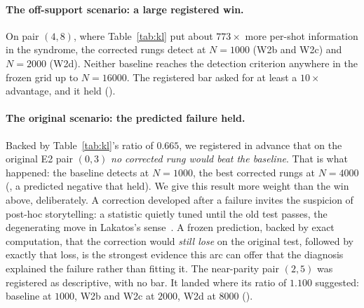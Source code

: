 \paragraph{The off-support scenario: a large registered win.} On pair $(4,8)$, where Table~\ref{tab:kl} put about $773\times$ more per-shot information in the syndrome, the corrected rungs detect at $N = 1000$ (W2b and W2c) and $N = 2000$ (W2d). Neither baseline reaches the detection criterion anywhere in the frozen grid up to $N = 16000$. The registered bar asked for at least a $10\times$ advantage, and it held (\gRegPos). %

\paragraph{The original scenario: the predicted failure held.} Backed by Table~\ref{tab:kl}'s ratio of $0.665$, we registered in advance that on the original E2 pair $(0,3)$ \emph{no corrected rung would beat the baseline}. That is what happened: the baseline detects at $N = 1000$, the best corrected rungs at $N = 4000$ (\gRegPos, a predicted negative that held). %
We give this result more weight than the win above, deliberately. A correction developed after a failure invites the suspicion of post-hoc storytelling: a statistic quietly tuned until the old test passes, the degenerating move in Lakatos's sense~\cite{lakatos1978methodology}. A frozen prediction, backed by exact computation, that the correction would \emph{still lose} on the original test, followed by exactly that loss, is the strongest evidence this arc can offer that the diagnosis explained the failure rather than fitting it. The near-parity pair $(2,5)$ was registered as descriptive, with no bar. It landed where its ratio of $1.100$ suggested: baseline at $1000$, W2b and W2c at $2000$, W2d at $8000$ (\gMeasured). %

